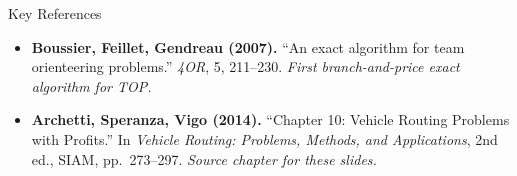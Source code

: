 \documentclass[aspectratio=169,10pt]{beamer}
\begin{document}
\begin{frame}[allowframebreaks]{Key References}
\begin{itemize}
    \item \textbf{Boussier, Feillet, Gendreau (2007).}
          ``An exact algorithm for team orienteering problems.''
          \emph{4OR}, 5, 211--230.
          \textit{First branch-and-price exact algorithm for TOP.}

    \item \textbf{Archetti, Speranza, Vigo (2014).}
          ``Chapter 10: Vehicle Routing Problems with Profits.''
          In \emph{Vehicle Routing: Problems, Methods, and Applications},
          2nd ed., SIAM, pp.\ 273--297.
          \textit{Source chapter for these slides.}
  \end{itemize}

\end{frame}

\end{document}
